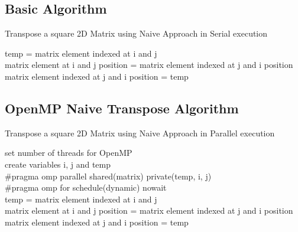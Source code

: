 \documentclass[10pt,onecolumn]{article}
\begin{document}
\subsection{Basic Algorithm}
%
\begin{algorithm}[H]
    \caption{Transpose a square 2D Matrix using Naive Approach in Serial execution}
    {
        {
            temp = matrix element indexed at i and j \\
            matrix element at i and j position = matrix element indexed at j and i position\\
            matrix element indexed at j and i position = temp
        }
    }
\end{algorithm}
%
\subsection{OpenMP Naive Transpose Algorithm}
%
\begin{algorithm}[H]
    \caption{Transpose a square 2D Matrix using Naive Approach in Parallel execution}
    set number of threads for OpenMP\\
    create variables i, j and temp\\
    \#pragma omp parallel shared(matrix) private(temp, i, j)\\
    \#pragma omp for schedule(dynamic) nowait\\
    {
        {
            temp = matrix element indexed at i and j \\
            matrix element at i and j position = matrix element indexed at j and i position \\
            matrix element indexed at j and i position = temp
        }
    }
\end{algorithm}
%
\end{document}
